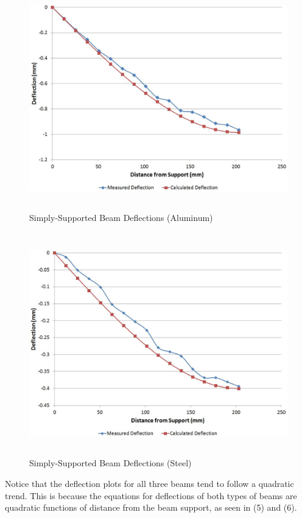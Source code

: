 \documentclass[12pt]{article}
\begin{document}
\begin{figure}[h!]  
  \centering
    \includegraphics[width=\linewidth,height=3.8in]{simp_support_a_deflection.JPG}
    \caption{Simply-Supported Beam Deflections (Aluminum)}
\end{figure}

\bigskip

\begin{figure}[h!]  
  \centering
    \includegraphics[width=\linewidth,height=3.8in]{simp_support_s_deflection.JPG}
    \caption{Simply-Supported Beam Deflections (Steel)}
\end{figure}


\newpage

Notice that the deflection plots for all three beams tend to follow a quadratic trend. This is because the equations for deflections of both types of beams are quadratic functions of distance from the beam support, as seen in (5) and (6).
\bigskip	
\end{document}
